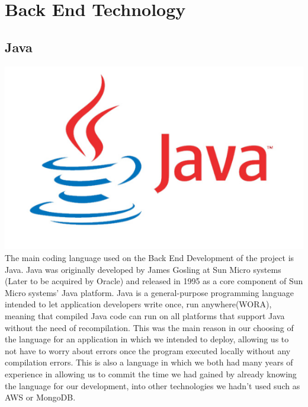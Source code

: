 \section{Back End Technology}

\subsection{Java}
\includegraphics[scale = 0.6]{img/java-logo-1.png}\newline
The main coding language used on the Back End Development of the project is Java. Java was originally developed by James Gosling at Sun Micro systems (Later to be acquired by Oracle) and released in 1995 as a core component of Sun Micro systems' Java platform. Java is a general-purpose programming language intended to let application developers write once, run anywhere(WORA), meaning that compiled Java code can run on all platforms that support Java without the need of recompilation. \newline
This was the main reason in our choosing of the language for an application in which we intended to deploy, allowing us to not have to worry about errors once the program executed locally without any compilation errors. This is also a language in which we both had many years of experience in allowing us to commit the time we had gained by already knowing the language for our development, into other technologies we hadn't used such as AWS or MongoDB.

